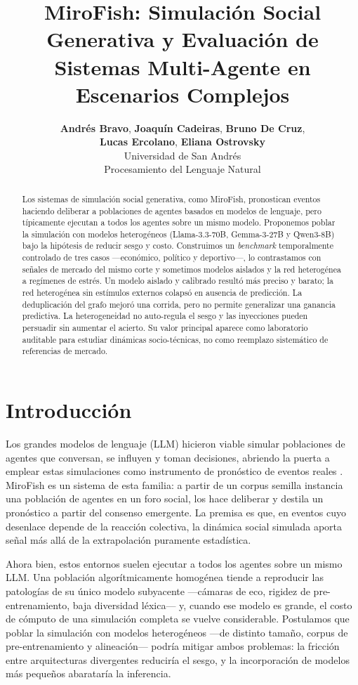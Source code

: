 \documentclass[11pt]{article}
\title{MiroFish: Simulación Social Generativa y Evaluación de \\ Sistemas Multi-Agente en Escenarios Complejos}
\author{
  \textbf{Andrés Bravo}, \textbf{Joaquín Cadeiras}, \textbf{Bruno De Cruz}, \\
  \textbf{Lucas Ercolano}, \textbf{Eliana Ostrovsky} \\
  Universidad de San Andrés \\
  \small{Procesamiento del Lenguaje Natural}
}
\begin{document}
\maketitle

\begin{abstract}
Los sistemas de simulación social generativa, como MiroFish, pronostican eventos haciendo deliberar a poblaciones de agentes basados en modelos de lenguaje, pero típicamente ejecutan a todos los agentes sobre un mismo modelo. Proponemos poblar la simulación con modelos heterogéneos (Llama-3.3-70B, Gemma-3-27B y Qwen3-8B) bajo la hipótesis de reducir sesgo y costo. Construimos un \textit{benchmark} temporalmente controlado de tres casos —económico, político y deportivo—, lo contrastamos con señales de mercado del mismo corte y sometimos modelos aislados y la red heterogénea a regímenes de estrés. Un modelo aislado y calibrado resultó más preciso y barato; la red heterogénea sin estímulos externos colapsó en ausencia de predicción. La deduplicación del grafo mejoró una corrida, pero no permite generalizar una ganancia predictiva. La heterogeneidad no auto-regula el sesgo y las inyecciones pueden persuadir sin aumentar el acierto. Su valor principal aparece como laboratorio auditable para estudiar dinámicas socio-técnicas, no como reemplazo sistemático de referencias de mercado.
\end{abstract}

\section{Introducción}
\label{sec:intro}

Los grandes modelos de lenguaje (LLM) hicieron viable simular poblaciones de agentes que conversan, se influyen y toman decisiones, abriendo la puerta a emplear estas simulaciones como instrumento de pronóstico de eventos reales \citep{park2023generative, yang2024oasis}. MiroFish \citep{mirofish2025} es un sistema de esta familia: a partir de un corpus semilla instancia una población de agentes en un foro social, los hace deliberar y destila un pronóstico a partir del consenso emergente. La premisa es que, en eventos cuyo desenlace depende de la reacción colectiva, la dinámica social simulada aporta señal más allá de la extrapolación puramente estadística.

Ahora bien, estos entornos suelen ejecutar a todos los agentes sobre un mismo LLM. Una población algorítmicamente homogénea tiende a reproducir las patologías de su único modelo subyacente —cámaras de eco, rigidez de pre-entrenamiento, baja diversidad léxica— y, cuando ese modelo es grande, el costo de cómputo de una simulación completa se vuelve considerable. Postulamos que poblar la simulación con modelos heterogéneos —de distinto tamaño, corpus de pre-entrenamiento y alineación— podría mitigar ambos problemas: la fricción entre arquitecturas divergentes reduciría el sesgo, y la incorporación de modelos más pequeños abarataría la inferencia.
\end{document}
